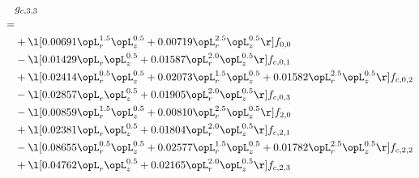 \begin{alignat}{2} 
\label{eq:g_33_0} 
& g_{c,3,3} \nonumber \\ 
 = \\ 
& + \l[  0.00691 \opL_r^{1.5} \opL_z^{0.5} +  0.00719 \opL_r^{2.5} \opL_z^{0.5}  \r] f_{0,0} \nonumber \\ 
& - \l[  0.01429 \opL_r \opL_z^{0.5} +  0.01587 \opL_r^{2.0} \opL_z^{0.5}  \r] f_{c,0,1} \nonumber \\ 
& + \l[  0.02414 \opL_r^{0.5} \opL_z^{0.5} +  0.02073 \opL_r^{1.5} \opL_z^{0.5} +  0.01582 \opL_r^{2.5} \opL_z^{0.5}  \r] f_{c,0,2} \nonumber \\ 
& - \l[  0.02857 \opL_r \opL_z^{0.5} +  0.01905 \opL_r^{2.0} \opL_z^{0.5}  \r] f_{c,0,3} \nonumber \\ 
& - \l[  0.00859 \opL_r^{1.5} \opL_z^{0.5} +  0.00810 \opL_r^{2.5} \opL_z^{0.5}  \r] f_{2,0} \nonumber \\ 
& + \l[  0.02381 \opL_r \opL_z^{0.5} +  0.01804 \opL_r^{2.0} \opL_z^{0.5}  \r] f_{c,2,1} \nonumber \\ 
& - \l[  0.08655 \opL_r^{0.5} \opL_z^{0.5} +  0.02577 \opL_r^{1.5} \opL_z^{0.5} +  0.01782 \opL_r^{2.5} \opL_z^{0.5}  \r] f_{c,2,2} \nonumber \\ 
& + \l[  0.04762 \opL_r \opL_z^{0.5} +  0.02165 \opL_r^{2.0} \opL_z^{0.5}  \r] f_{c,2,3} \nonumber \\ 
\end{alignat} 


